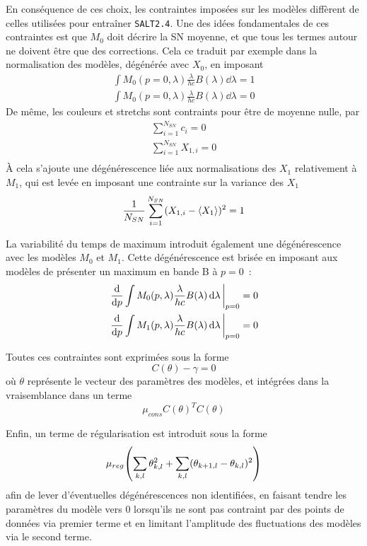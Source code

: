 \documentclass{book}
\def\saltd{\texttt{SALT2.4}\xspace}
\begin{document}
En conséquence de ces choix, les contraintes imposées sur les modèles diffèrent de celles utilisées pour entraîner \saltd. Une des idées fondamentales de ces contraintes est que $M_0$ doit décrire la SN moyenne, et que tous les termes autour ne doivent être que des corrections. Cela ce traduit par exemple dans la normalisation des modèles, dégénérée avec $X_0$, en imposant
\begin{gather}
	\int M_0(p=0,\lambda) \frac{\lambda}{hc} B(\lambda) \dd{\lambda} = 1\\
	\int M_0(p=0,\lambda) \frac{\lambda}{hc} B(\lambda) \dd{\lambda} = 0
\end{gather}
De même, les couleurs et stretchs sont contraints pour être de moyenne nulle, par
\begin{gather}
	\sum_{i=1}^{N_{SN}} c_i = 0\\
	\sum_{i=1}^{N_{SN}} X_{1,i} = 0\\
\end{gather}
À cela s'ajoute une dégénérescence liée aux normalisations des $X_1$ relativement à $M_1$, qui est levée en imposant une contrainte sur la variance des $X_1$
\begin{gather}
	\frac{1}{N_{SN}} \sum_{i=1}^{N_{SN}} (X_{1,i} - \ev{X_1})^2 = 1
\end{gather}

La variabilité du temps de maximum introduit également une dégénérescence avec les modèles $M_0$ et $M_1$. Cette dégénérescence est brisée en imposant aux modèles de présenter un maximum en bande B à $p=0$~:
\begin{gather}
	\eval{\dv{p} \int M_0(p,\lambda) \frac{\lambda}{hc} B(\lambda) \dd{\lambda}}_{p=0} = 0\\
	\eval{\dv{p} \int M_1(p,\lambda) \frac{\lambda}{hc} B(\lambda) \dd{\lambda}}_{p=0} = 0
\end{gather}

Toutes ces contraintes sont exprimées sous la forme
\begin{equation}
	C(\theta) - \gamma = 0
\end{equation}
où $\theta$ représente le vecteur des paramètres des modèles, et intégrées dans la vraisemblance dans un terme
\begin{equation}
	\mu_{cons} C(\theta)^T C(\theta)
\end{equation}

Enfin, un terme de régularisation est introduit sous la forme
\begin{equation}
	\mu_{reg} \qty(\sum_{k,l} \theta^2_{k,l} + \sum_{k,l} (\theta_{k+1, l} - \theta_{k,l})^2)
\end{equation}
afin de lever d'éventuelles dégénérescences non identifiées, en faisant tendre les paramètres du modèle vers 0 lorsqu'ils ne sont pas contraint par des points de données via premier terme et en limitant l'amplitude des fluctuations des modèles via le second terme.
\end{document}
